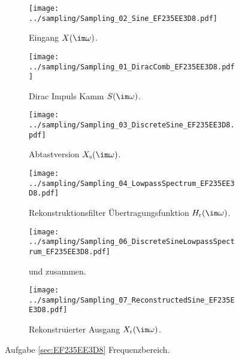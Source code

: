 









\begin{figure*}[h!]
\centering
\begin{subfigure}{0.49\textwidth}
\texttt{[image: ../sampling/Sampling\_02\_Sine\_EF235EE3D8.pdf]}
\caption{Eingang $X(\im\omega)$.}
\label{fig:Sampling_02_Sine_EF235EE3D8}
\end{subfigure}
\begin{subfigure}{0.49\textwidth}
\texttt{[image: ../sampling/Sampling\_01\_DiracComb\_EF235EE3D8.pdf]}
\caption{Dirac Impuls Kamm $S(\im\omega)$.}
\label{fig:Sampling_01_DiracComb_EF235EE3D8}
\end{subfigure}
\begin{subfigure}{0.49\textwidth}
\texttt{[image: ../sampling/Sampling\_03\_DiscreteSine\_EF235EE3D8.pdf]}
\caption{Abtastversion $X_\mathrm{s}(\im\omega)$.}
\label{fig:Sampling_03_DiscreteSine_EF235EE3D8}
\end{subfigure}
\begin{subfigure}{0.49\textwidth}
\texttt{[image: ../sampling/Sampling\_04\_LowpassSpectrum\_EF235EE3D8.pdf]}
\caption{Rekonstruktionsfilter Übertragungsfunktion $H_\mathrm{r}(\im\omega)$.}
\label{fig:Sampling_04_LowpassSpectrum_EF235EE3D8}
\end{subfigure}
\begin{subfigure}{0.49\textwidth}
\texttt{[image: ../sampling/Sampling\_06\_DiscreteSineLowpassSpectrum\_EF235EE3D8.pdf]}
\caption{
und
zusammen.
}
\label{fig:Sampling_06_DiscreteSineLowpassSpectrum_EF235EE3D8}
\end{subfigure}
\begin{subfigure}{0.49\textwidth}
\texttt{[image: ../sampling/Sampling\_07\_ReconstructedSine\_EF235EE3D8.pdf]}
\caption{Rekonstruierter Ausgang $X_\mathrm{r}(\im\omega)$.}
\label{fig:Sampling_07_ReconstructedSine_EF235EE3D8}
\end{subfigure}
\caption{Aufgabe \ref{sec:EF235EE3D8} Frequenzbereich.}
\label{fig:EF235EE3D8_FrequencyDomain}
\end{figure*}






